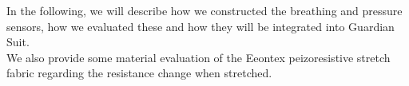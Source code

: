 \documentclass{sigchi-ext}
\begin{document}
In the following, we will describe how we constructed
the breathing and pressure sensors, how we evaluated
these and how they will be integrated into Guardian Suit.\\
We also provide some material evaluation of the Eeontex
peizoresistive stretch fabric regarding the resistance
change when stretched.

\end{document}
